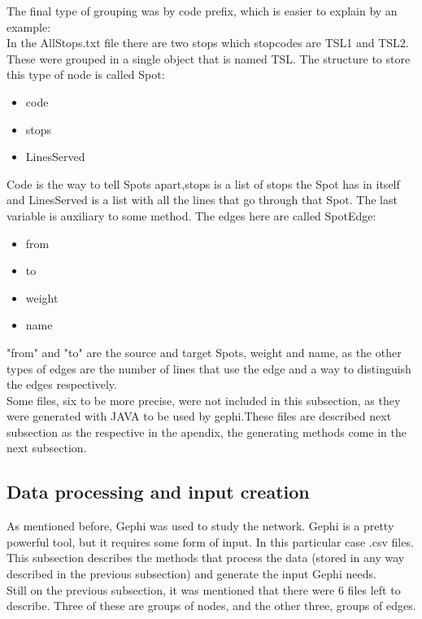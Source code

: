 \documentclass[12pt]{article}
\begin{document}
\begin{multicols}{2}
The final type of grouping was by code prefix, which is easier to explain by an example:\\
In the AllStops.txt file there are two stops which stopcodes are TSL1 and TSL2. These were grouped in a single object that is named TSL. The structure to store this type of node is called Spot:

\begin{itemize}
	\item code
	\item stops
	\item LinesServed
\end{itemize}
	
Code is the way to tell Spots apart,stops is a list of stops the Spot has in itself and LinesServed is a list with all the lines that go through that Spot. The last variable is auxiliary to some method. The edges here are called SpotEdge:\\

\begin{itemize}
    \item from
    \item to
    \item weight
    \item name
\end{itemize}

"from" and "to" are the source and target Spots, weight and name, as the other types of edges are the number of lines that use the edge and a way to distinguish the edges respectively.\\
Some files, six to be more precise, were not included in this subsection, as they were generated with JAVA to be used by gephi.These files are described next subsection as the respective in the apendix, the generating methods come in the next subsection.

\subsection{Data processing and input creation}
	
	As mentioned before, Gephi was used to study the network. Gephi is a pretty powerful tool, but it requires some form of input. In this particular case .csv files. This subsection describes the methods that process the data (stored in any way described in the previous subsection) and generate the input Gephi needs.\\
	Still on the previous subsection, it was mentioned that there were 6 files left to describe. Three of these are groups of nodes, and the other three, groups of edges.\\
	

\end{multicols}
\end{document}
